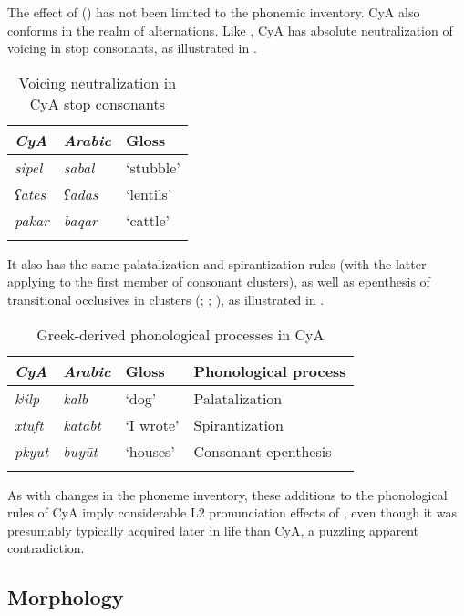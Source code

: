 \documentclass[output=paper]{langsci/langscibook}
\begin{document}
The effect of ()  has not been limited to the phonemic inventory. CyA also conforms in the realm of alternations. Like , CyA has absolute neutralization of voicing in stop consonants, as illustrated in .

\begin{table}
\begin{tabular}{>{\itshape}l>{\itshape}ll}
\lsptoprule
{\normalfont CyA} & {\normalfont Arabic} & {Gloss}\\\midrule
sipel & sabal & ‘stubble’\\
{}ʕates & ʕadas & ‘lentils’\\
pakar & baqar & ‘cattle’\\
\lspbottomrule
\end{tabular}
\caption{\label{bkm:Ref13775945}Voicing neutralization in CyA stop consonants\label{tab:walter:3}}
\end{table}

It also has the same palatalization and spirantization rules (with the latter applying to the first member of {consonant clusters}), as well as {epenthesis} of transitional occlusives in clusters (\citealt{Tsiapera1969}; \citealt{Borg1985}; \citealt{Roth2004}), as illustrated in .

\begin{table}
\begin{tabular}{>{\itshape}l>{\itshape}lll}
\lsptoprule
{\normalfont CyA} & {\normalfont Arabic} & {Gloss} & {Phonological process}\\\midrule
kʲilp & kalb & ‘dog’ & Palatalization\\
xtuft & katabt & ‘I wrote’ & Spirantization\\
pkyut & buyūt & ‘houses’ & Consonant {epenthesis}\\
\lspbottomrule
\end{tabular}
\caption{\label{bkm:Ref13776308}Greek-derived phonological processes in CyA\label{tab:walter:4}}
\end{table}

As with changes in the {phoneme} inventory, these additions to the phonological rules of CyA imply considerable L2 pronunciation effects of , even though it was presumably typically acquired later in life than CyA, a puzzling apparent contradiction.

\subsection{Morphology}\largerpage
\end{document}
